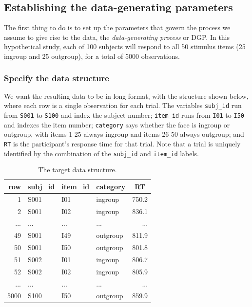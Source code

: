 \documentclass[doc,floatsintext]{apa6}
\begin{document}
\subsection{Establishing the data-generating
parameters}\label{establishing-the-data-generating-parameters}

The first thing to do is to set up the parameters that govern the
process we assume to give rise to the data, the \emph{data-generating
process} or DGP. In this hypothetical study, each of 100 subjects will
respond to all 50 stimulus items (25 ingroup and 25 outgroup), for a
total of 5000 observations.

\subsubsection{Specify the data
structure}\label{specify-the-data-structure}

We want the resulting data to be in long format, with the structure
shown below, where each row is a single observation for each trial. The
variables \texttt{subj\_id} run from \texttt{S001} to \texttt{S100} and
index the subject number; \texttt{item\_id} runs from \texttt{I01} to
\texttt{I50} and indexes the item number; \texttt{category} says whether
the face is ingroup or outgroup, with items 1-25 always ingroup and
items 26-50 always outgroup; and \texttt{RT} is the participant's
response time for that trial. Note that a trial is uniquely identified
by the combination of the \texttt{subj\_id} and \texttt{item\_id}
labels.

\begin{table}[H]
\begin{center}
\begin{threeparttable}
\caption{\label{tab:data-example}The target data structure.}
\begin{tabular}{rlllr}
\toprule
row & \multicolumn{1}{c}{subj\_id} & \multicolumn{1}{c}{item\_id} & \multicolumn{1}{c}{category} & \multicolumn{1}{c}{RT}\\
\midrule
1 & S001 & I01 & ingroup & 750.2\\
2 & S001 & I02 & ingroup & 836.1\\
... & ... & ... & ... & ...\\
49 & S001 & I49 & outgroup & 811.9\\
50 & S001 & I50 & outgroup & 801.8\\
51 & S002 & I01 & ingroup & 806.7\\
52 & S002 & I02 & ingroup & 805.9\\
... & ... & ... & ... & ...\\
5000 & S100 & I50 & outgroup & 859.9\\
\bottomrule
\end{tabular}
\end{threeparttable}
\end{center}
\end{table}
\end{document}
